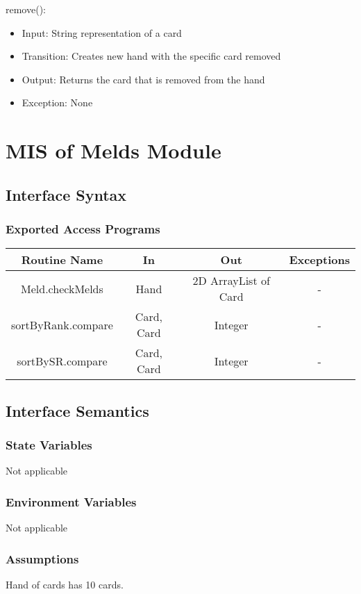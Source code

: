 \documentclass[12pt, titlepage]{article}
\begin{document}
\noindent remove():
\begin{itemize}
    \item Input: String representation of a card 
    \item Transition: Creates new hand with the specific card removed
    \item Output: Returns the card that is removed from the hand
    \item Exception: None
\end{itemize}

\section{MIS of Melds Module}

\subsection{Interface Syntax}
\subsubsection{Exported Access Programs}
\begin{tabular}[pos]{|c|c|c|c|}
	\hline
	\textbf{Routine Name}& \textbf{In} & \textbf{Out} & \textbf{Exceptions} \\ \hline
	Meld.checkMelds & Hand & 2D ArrayList of Card &  - \\\hline
	sortByRank.compare & Card, Card & Integer &  - \\\hline
	sortBySR.compare & Card, Card & Integer &  - \\\hline
\end{tabular}

\subsection{Interface Semantics}

\subsubsection{State Variables}
Not applicable

\subsubsection{Environment Variables}
Not applicable

\subsubsection{Assumptions}
Hand of cards has 10 cards. 
\end{document}
